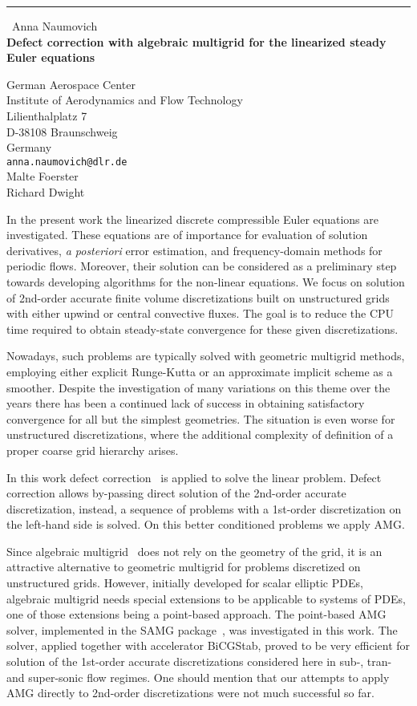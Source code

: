 \documentclass{report}
\begin{document}
\begin{center}
\rule{6in}{1pt} \
{\large Anna Naumovich \\
{\bf Defect correction with algebraic multigrid for the linearized steady Euler equations}}

German Aerospace Center \\ Institute of Aerodynamics and Flow Technology \\ Lilienthalplatz 7 \\ D-38108 Braunschweig \\ Germany
\\
{\tt anna.naumovich@dlr.de}\\
Malte Foerster\\
Richard Dwight\end{center}

In the present work the linearized discrete compressible Euler equations
are investigated.
These equations are of importance for evaluation of solution derivatives,
{\it a posteriori} error estimation, and frequency-domain methods for periodic flows.
Moreover, their solution can be considered as a preliminary step towards developing
algorithms for the non-linear equations. We focus on solution of 2nd-order accurate
finite volume discretizations built on unstructured grids with either upwind or central
convective fluxes. The goal is to reduce the CPU time required to obtain steady-state
convergence for these given discretizations.

Nowadays, such problems are typically solved with geometric multigrid methods,
employing either explicit Runge-Kutta or an approximate implicit scheme as a smoother.
Despite the investigation of many variations on this theme over the years there has
been a continued lack of success in obtaining satisfactory convergence for all but
the simplest geometries. The situation is even worse for unstructured discretizations,
where the additional complexity of definition of a proper coarse grid hierarchy arises.

In this work defect correction~\cite{DC1, DC2} is applied to solve the linear problem.
Defect correction allows by-passing direct solution of the 2nd-order
accurate discretization,
instead, a sequence of problems with a 1st-order discretization on the left-hand side
is solved. On this better conditioned problems we apply AMG.

Since algebraic multigrid~\cite{AMG1, AMG2, AMG3} does not rely on the
geometry of the grid,
it is an attractive alternative to geometric multigrid for problems
discretized on unstructured grids.
However, initially developed for scalar elliptic PDEs, algebraic
multigrid needs special extensions
to be applicable to systems of PDEs, one of those extensions being a
point-based approach.
The point-based AMG solver, implemented in the SAMG package~\cite{SAMG}, was investigated
in this work. The solver, applied together with accelerator BiCGStab,
proved to be very efficient for
solution of the 1st-order accurate discretizations considered here in
sub-, tran- and super-sonic flow
regimes. One should mention that our attempts to apply AMG directly to
2nd-order discretizations were
not much successful so far.
\end{document}
